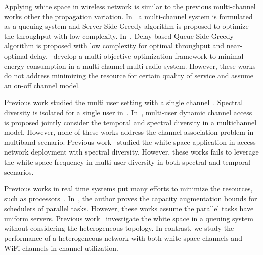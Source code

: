 Applying white space in wireless network is similar to the previous multi-channel works other the 
propagation variation. In~\cite{bodas2012low} a multi-channel system is formulated as a queuing 
system and Server Side Greedy algorithm is proposed to optimize the throughput with low complexity. 
In~\cite{ji2013performance}, Delay-based Queue-Side-Greedy algorithm is proposed with low complexity 
for optimal throughput and near-optimal delay.~\cite{liu2014energy} develop a multi-objective optimization 
framework to minimal energy consumption in a multi-channel multi-radio system. 
However, these works do not address minimizing the resource for certain quality of service and assume an 
on-off channel model.

Previous work studied the multi user setting with a single channel~\cite{tan2010distributed}. 
Spectral diversity is isolated for a single user in~\cite{shu2009throughput}. In~\cite{liu2013stay}, 
multi-user dynamic channel access is proposed jointly consider the temporal and spectral diversity in a multichannel model. However, 
none of these works address the channel association problem in multiband scenario.
Previous work~\cite{pcuiwinmee} studied the 
white space application in access network deployment with spectral diversity. However, these works 
fails to leverage the white space frequency in multi-user diversity in both spectral and temporal scenarios.

Previous works in real time systems put many efforts to minimize the resources, such as processors~\cite{nelissen2012techniques}.
In~\cite{li2014analysis}, the author proves the capacity augmentation bounds for schedulers of parallel tasks. 
However, these works assume the parallel tasks have uniform servers. 
Previous work~\cite{chen2011feasibility} investigate the white space in a queuing system without considering the 
heterogeneous topology.
In contrast, we study the performance of a heterogeneous network with both white space channels 
and WiFi channels in channel utilization. 






